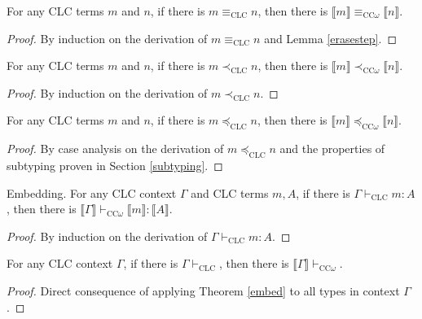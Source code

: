 \documentclass[sigplan,screen,review,anonymous]{acmart}
\newcommand{\erase}[1]{\llbracket #1 \rrbracket}
\begin{document}
\begin{lemma}
  For any CLC terms $m$ and $n$, if there is $m \equiv_{\scriptscriptstyle \text{CLC}} n$, then there is $\erase{m} \equiv_{\scriptscriptstyle \text{CC$\omega$}} \erase{n}$.
\end{lemma}
\begin{proof}
  By induction on the derivation of $m \equiv_{\scriptscriptstyle \text{CLC}} n$ and Lemma \ref{erasestep}.
\end{proof}

\begin{lemma}\label{erasesub1}
  For any CLC terms $m$ and $n$, if there is $m \prec_{\scriptscriptstyle \text{CLC}} n$, then there is $\erase{m} \prec_{\scriptscriptstyle \text{CC$\omega$}} \erase{n}$.
\end{lemma}
\begin{proof}
  By induction on the derivation of $m \prec_{\scriptscriptstyle \text{CLC}} n$.
\end{proof}

\begin{lemma}
  For any CLC terms $m$ and $n$, if there is $m \preceq_{\scriptscriptstyle \text{CLC}} n$, then there is $\erase{m} \preceq_{\scriptscriptstyle \text{CC$\omega$}} \erase{n}$.
\end{lemma}
\begin{proof}
  By case analysis on the derivation of $m \preceq_{\scriptscriptstyle \text{CLC}} n$ and the properties of subtyping proven in Section \ref{subtyping}.
\end{proof}

\begin{theorem}\label{embed}
  Embedding. For any CLC context $\Gamma$ and CLC terms $m, A$, if there is $\Gamma \vdash_{\scriptscriptstyle \text{CLC}} m : A$, then there is $\erase{\Gamma} \vdash_{\scriptscriptstyle \text{CC$\omega$}} \erase{m} : \erase{A}$.
\end{theorem}
\begin{proof}
  By induction on the derivation of $\Gamma \vdash_{\scriptscriptstyle \text{CLC}} m : A$.
\end{proof}

\begin{corollary}\label{embeddingcontext}
  For any CLC context $\Gamma$, if there is $\Gamma \vdash_{\scriptscriptstyle \text{CLC}}$, then there is $\erase{\Gamma} \vdash_{\scriptscriptstyle \text{CC$\omega$}}$.
\end{corollary}
\begin{proof}
  Direct consequence of applying Theorem \ref{embed} to all types in context $\Gamma$.
\end{proof}
\end{document}

